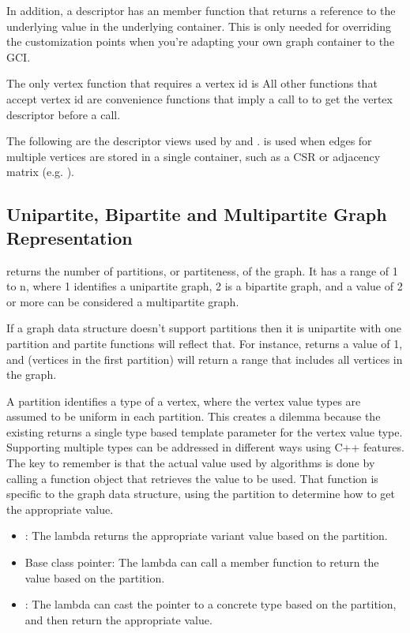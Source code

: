 In addition, a descriptor has an  member function that returns a reference to the underlying value
in the underlying container. This is only needed for overriding the customization points when you're adapting your own
graph container to the GCI.
 
The only vertex function that requires a vertex id is  All other functions
that accept vertex id are convenience functions that imply a call to to get the vertex 
descriptor before a call.

The following are the descriptor views used by  and .  
is used when edges for multiple vertices are stored in a single container, such as a CSR or adjacency matrix
(e.g. ).
{\small
      
}

\subsection{Unipartite, Bipartite and Multipartite Graph Representation}

 returns the number of partitions, or partiteness, of the graph. It has a range of 1 to n, where 1 identifies 
a unipartite graph, 2 is a bipartite graph, and a value of 2 or more can be considered a multipartite graph. 

If a graph data structure doesn't support partitions then it is unipartite with one partition and partite functions will reflect that. 
For instance,  returns a value of 1, and  (vertices in the first partition) will return a range that includes all vertices in the graph.

A partition identifies a type of a vertex, where the vertex value types are assumed to be uniform in each partition. This creates a dilemma because 
the existing  returns a single type based template parameter for the vertex value type. Supporting 
multiple types can be addressed in different ways using C++ features. The key to remember is that the actual value used by algorithms is done
by calling a function object that retrieves the value to be used. That function is specific to the graph data structure, using the partition to 
determine how to get the appropriate value.
\begin{itemize}
    \item
          : The lambda returns the appropriate variant value based on the partition.
    \item
          Base class pointer: The lambda can call a member function to return the value based on the partition.
    \item
          : The lambda can cast the pointer to a concrete type based on the partition, and
          then return the appropriate value.
\end{itemize}

